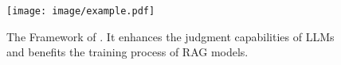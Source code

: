 \begin{figure}[t]
    \centering
    \texttt{[image: image/example.pdf]}
    \caption{The Framework of \method{}. It enhances the judgment capabilities of LLMs and benefits the training process of RAG models.}
    \label{fig:example}
\end{figure}

